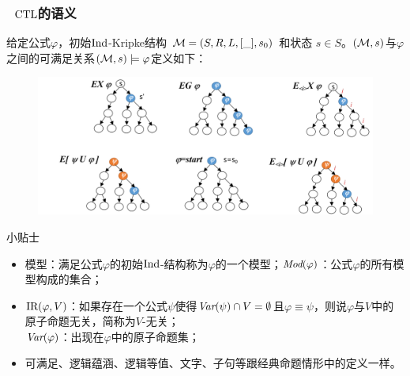 \documentclass[9pt, CJK]{beamer}
\begin{document}
\begin{frame} 
	\frametitle{~$\textrm{CTL}$的语义}
	{\footnotesize  
		\begin{definition}\label{def:ctl:semantic}
			给定公式$\varphi$，初始$\textrm{Ind}$-Kripke结构 ${\cal M}=(S,R,L,[\_],s_0)$ 和状态 $s\in S$。$({\cal M},s)$与$\varphi$之间的可满足关系$({\cal M},s)\models \varphi$定义如下：
			\begin{figure}
				\includegraphics[scale=0.3]{figures/semanticCTL}
			\end{figure}
		\end{definition}%
		\begin{block}{{\footnotesize 小贴士}}
			\tiny{
				\begin{itemize}
					\item \textcolor{blue!80}{模型}：满足公式$\varphi$的初始$\textrm{Ind}$-结构称为$\varphi$的一个模型；\qquad $\textit{Mod}(\varphi)$：公式$\varphi$的所有模型构成的集合； 
					\item \textcolor{blue!80}{$\textrm{IR}(\varphi,V)$}：如果存在一个公式$\psi$使得$\textit{Var}(\psi) \cap V = \emptyset$且$\varphi \equiv \psi$，则说$\varphi$与$V$中的原子命题\textcolor{blue!80}{无关}，简称为\textcolor{blue!80}{$V$-无关}；\\ $\textit{Var}(\varphi)$：出现在$\varphi$中的原子命题集；
					\item 可满足、逻辑蕴涵、逻辑等值、文字、子句等跟经典命题情形中的定义一样。
				\end{itemize}
			}
		\end{block} 
	}
\end{frame}
\end{document}
